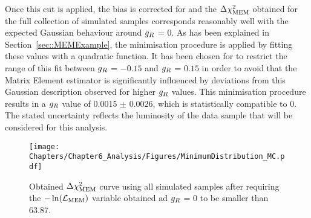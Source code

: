 Once this cut is applied, the bias is corrected for and the $\Delta \chi^{2}_{\textrm{MEM}}$ obtained for the full collection of simulated samples corresponds reasonably well with the expected Gaussian behaviour around $g_{R}$ = 0.
As has been explained in Section~\ref{sec::MEMExample}, the minimisation procedure is applied by fitting these values with a quadratic function. It has been chosen for to restrict the range of this fit between $g_{R}$ = $-0.15$ and $g_{R}$ = $0.15$ in order to avoid that the Matrix Element estimator is significantly influenced by deviations from this Gaussian description observed for higher $g_{R}$ values.
This minimisation procedure results in a $g_{R}$ value of 0.0015 $\pm$ 0.0026, which is statistically compatible to $0$. The stated uncertainty reflects the luminosity of the data sample that will be considered for this analysis.
\\
\begin{figure}[h!t]
 \centering
 \texttt{[image: Chapters/Chapter6\_Analysis/Figures/MinimumDistribution\_MC.pdf]}
 \caption{Obtained $\Delta \chi^{2}_{\textrm{MEM}}$ curve using all simulated samples after requiring the $-\ln(\mathcal{L}_{\textrm{MEM}})$ variable obtained ad $g_{R}$ = 0 to be smaller than $63.87$.} \label{fig::MinNominal}
\end{figure}


